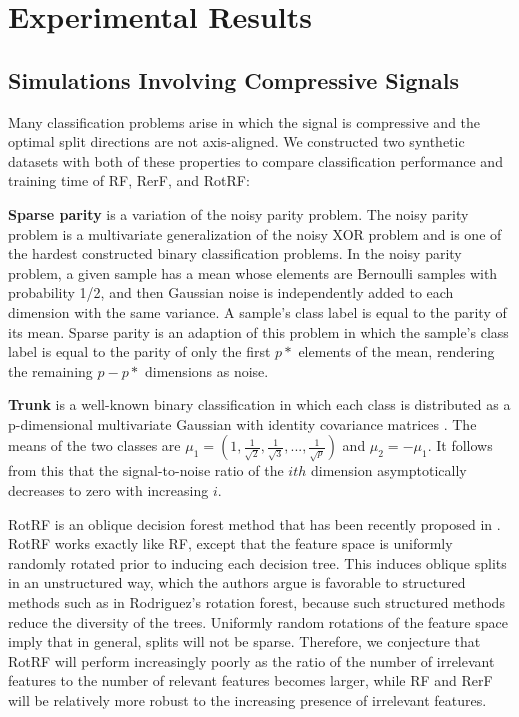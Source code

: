 \documentclass{article}
\begin{document}
\section{Experimental Results}


\subsection{Simulations Involving Compressive Signals}
\label{section: sims}

Many classification problems arise in which the signal is compressive and the optimal split directions are not axis-aligned. We constructed two synthetic datasets with both of these properties to compare classification performance and training time of RF, RerF, and RotRF:

\textbf{Sparse parity} is a variation of the noisy parity problem. The noisy parity problem is a multivariate generalization of the noisy XOR problem and is one of the hardest constructed binary classification problems. In the noisy parity problem, a given sample has a mean whose elements are Bernoulli samples with probability 1/2, and then Gaussian noise is independently added to each dimension with the same variance.  A sample's class label is equal to the parity of its mean. Sparse parity is an adaption of this problem in which the sample's class label is equal to the parity of only the first $p*$ elements of the mean, rendering the remaining $p - p*$ dimensions as noise.

\textbf{Trunk} is a well-known binary classification in which each class is distributed as a p-dimensional multivariate Gaussian with identity covariance matrices \cite{Trunk1979}. The means of the two classes are $\mu_1 = (1,\frac{1}{\sqrt{2}},\frac{1}{\sqrt{3}},...,\frac{1}{\sqrt{p}})$ and $\mu_2 = -\mu_1$. It follows from this that the signal-to-noise ratio of the $ith$ dimension asymptotically decreases to zero with increasing $i$.

RotRF is an oblique decision forest method that has been recently proposed in \cite{Blaser2015}. RotRF works exactly like RF, except that the feature space is uniformly randomly rotated prior to inducing each decision tree. This induces oblique splits in an unstructured way, which the authors argue is favorable to structured methods such as in Rodriguez's rotation forest, because such structured methods reduce the diversity of the trees. Uniformly random rotations of the feature space imply that in general, splits will not be sparse. Therefore, we conjecture that RotRF will perform increasingly poorly as the ratio of the number of irrelevant features to the number of relevant features becomes larger, while RF and RerF will be relatively more robust to the increasing presence of irrelevant features.
\end{document}
